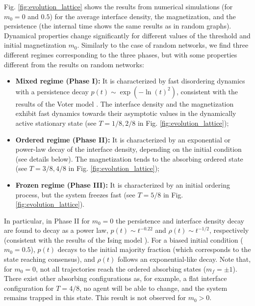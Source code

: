 	Fig. \ref{fig:evolution_lattice} shows the results from numerical simulations (for $m_0 = 0$ and $0.5$) for the average interface density, the magnetization, and the persistence (the internal time shows the same results as in random graphs). Dynamical properties change significantly for different values of the threshold and initial magnetization $m_0$. Similarly to the case of random networks, we find three different regimes corresponding to the three phases, but with some properties different from the results on  random networks:
	\begin{itemize}
		\item \textbf{Mixed regime (Phase I):} It is characterized by fast disordering dynamics with a persistence decay $p(t) \sim \exp(- \ln(t)^2)$, consistent with the results of the Voter model \cite{ben-naim-1996}. The interface density and the magnetization exhibit fast dynamics towards their asymptotic values in the dynamically active stationary state (see $T = 1/8,2/8$ in Fig. \ref{fig:evolution_lattice});
		\item \textbf{Ordered regime (Phase II):} It is characterized by an exponential or power-law decay of the interface density, depending on the initial condition (see details below). The magnetization tends to the absorbing ordered state (see $T = 3/8,4/8$ in Fig. \ref{fig:evolution_lattice});
		\item \textbf{Frozen regime (Phase III):} It is characterized by an initial ordering process, but the system freezes fast (see $T = 5/8$ in Fig. \ref{fig:evolution_lattice}).
	\end{itemize}
	
	In particular, in Phase II for $m_0 = 0$ the persistence and interface density decay are found to decay as a power law, $p(t) \sim t^{-0.22}$ and $\rho(t) \sim t^{-1/2}$, respectively (consistent with the results of the Ising model \cite{stauffer-1994,derrida-1995A,derrida-1995B,derrida-1997}). For a biased initial condition ($m_0 = 0.5$), $p(t)$ decays to the initial majority fraction (which corresponds to the state reaching consensus), and $\rho(t)$ follows an exponential-like decay. Note that, for $m_0 = 0$, not all trajectories reach the ordered absorbing states ($m_f=\pm 1$). There exist other absorbing configurations as, for example,  a flat interface configuration for $T = 4/8$, no agent will be able to change, and the system remains trapped in this state. This result is not observed for $m_0 > 0$.
	
